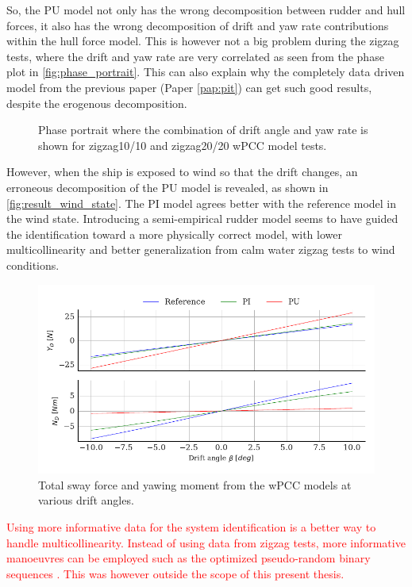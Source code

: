 So, the PU model not only has the wrong decomposition between rudder and hull forces, it also has the wrong decomposition of drift and yaw rate contributions within the hull force model. This is however not a big problem during the zigzag tests, where the drift and yaw rate are very correlated as seen from the phase plot in \autoref{fig:phase_portrait}. This can also explain why the completely data driven model from the previous paper (Paper \ref{pap:pit}) can get such good results, despite the erogenous decomposition.
\begin{figure}[h]
  \centering
  
  \caption{Phase portrait where the combination of drift angle and yaw rate is shown for zigzag10/10 and zigzag20/20 wPCC model tests.}
  \label{fig:phase_portrait}
\end{figure}
However, when the ship is exposed to wind so that the drift changes, an erroneous decomposition of the PU model is revealed, as shown in \autoref{fig:result_wind_state}. The PI model agrees better with the reference model in the wind state. Introducing a semi-empirical rudder model seems to have guided the identification toward a more physically correct model, with lower multicollinearity and better generalization from calm water zigzag tests to wind conditions.
\begin{figure}[h!]
    \includegraphics{kappa/images/result_wind_state.forces.pdf}
    \caption{Total sway force and yawing moment from the wPCC models at various drift angles.}
    \label{fig:result_wind_state}
\end{figure}

\textcolor{red}{
Using more informative data for the system identification is a better way to handle multicollinearity. Instead of using data from zigzag tests, more informative manoeuvres can be employed such as the optimized pseudo-random binary sequences \cite{yoonIdentificationHydrodynamicCoefficients2003,wangOptimalDesignExcitation2020}. This was however outside the scope of this present thesis.
}

\FloatBarrier
\clearpage